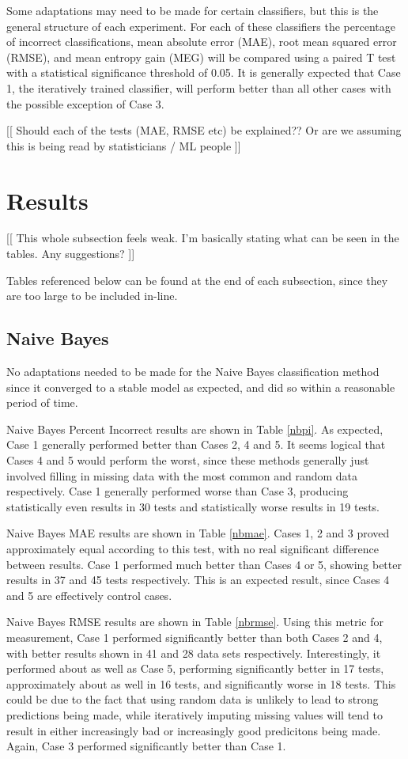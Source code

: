 Some adaptations may need to be made for certain classifiers, but this is the general structure of each experiment. For each of these classifiers the percentage of incorrect classifications, mean absolute error (MAE), root mean squared error (RMSE), and mean entropy gain (MEG) will be compared using a paired T test with a statistical significance threshold of 0.05. It is generally expected that Case 1, the iteratively trained classifier, will perform better than all other cases with the possible exception of Case 3.

[[ Should each of the tests (MAE, RMSE etc) be explained?? Or are we assuming this is being read by statisticians / ML people ]]

\section{Results}

[[ This whole subsection feels weak. I'm basically stating what can be seen in the tables. Any suggestions? ]]

Tables referenced below can be found at the end of each subsection, since they are too large to be included in-line.

\subsection{Naive Bayes}
No adaptations needed to be made for the Naive Bayes classification method since it converged to a stable model as expected, and did so within a reasonable period of time.

Naive Bayes Percent Incorrect results are shown in Table \ref{nbpi}. As expected, Case 1 generally performed better than Cases 2, 4 and 5. It seems logical that Cases 4 and 5 would perform the worst, since these methods generally just involved filling in missing data with the most common and random data respectively. Case 1 generally performed worse than Case 3, producing statistically even results in 30 tests and statistically worse results in 19 tests.

Naive Bayes MAE results are shown in Table \ref{nbmae}. Cases 1, 2 and 3 proved approximately equal according to this test, with no real significant difference between results. Case 1 performed much better than Cases 4 or 5, showing better results in 37 and 45 tests respectively. This is an expected result, since Cases 4 and 5 are effectively control cases.

Naive Bayes RMSE results are shown in Table \ref{nbrmse}. Using this metric for measurement, Case 1 performed significantly better than both Cases 2 and 4, with better results shown in 41 and 28 data sets respectively. Interestingly, it performed about as well as Case 5, performing significantly better in 17 tests, approximately about as well in 16 tests, and significantly worse in 18 tests. This could be due to the fact that using random data is unlikely to lead to strong predictions being made, while iteratively imputing missing values will tend to result in either increasingly bad or increasingly good predicitons being made. Again, Case 3 performed significantly better than Case 1.

